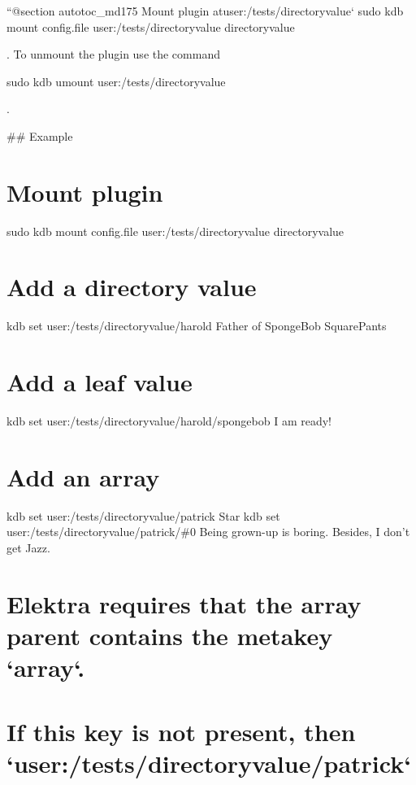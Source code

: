 ``{\ttfamily  @section autotoc\+\_\+md175 Mount plugin at}user\+:/tests/directoryvalue` sudo kdb mount config.\+file user\+:/tests/directoryvalue directoryvalue 
\begin{DoxyCode}
. To unmount the plugin use the command
\end{DoxyCode}
 sudo kdb umount user\+:/tests/directoryvalue 
\begin{DoxyCode}
.

## Example
\end{DoxyCode}
 \hypertarget{autotoc_md170_autotoc_md176}{}\section{Mount plugin}\label{autotoc_md170_autotoc_md176}
sudo kdb mount config.\+file user\+:/tests/directoryvalue directoryvalue\hypertarget{autotoc_md170_autotoc_md177}{}\section{Add a directory value}\label{autotoc_md170_autotoc_md177}
kdb set user\+:/tests/directoryvalue/harold \textquotesingle{}Father of Sponge\+Bob Square\+Pants\textquotesingle{} \hypertarget{autotoc_md170_autotoc_md178}{}\section{Add a leaf value}\label{autotoc_md170_autotoc_md178}
kdb set user\+:/tests/directoryvalue/harold/spongebob \textquotesingle{}I am ready!\textquotesingle{}\hypertarget{autotoc_md170_autotoc_md179}{}\section{Add an array}\label{autotoc_md170_autotoc_md179}
kdb set user\+:/tests/directoryvalue/patrick Star kdb set user\+:/tests/directoryvalue/patrick/\#0 \textquotesingle{}Being grown-\/up is boring. Besides, I don’t get Jazz.\textquotesingle{} \hypertarget{autotoc_md170_autotoc_md180}{}\section{Elektra requires that the array parent contains the metakey `array`.}\label{autotoc_md170_autotoc_md180}
\hypertarget{autotoc_md170_autotoc_md181}{}\section{If this key is not present, then `user\+:/tests/directoryvalue/patrick`}\label{autotoc_md170_autotoc_md181}
